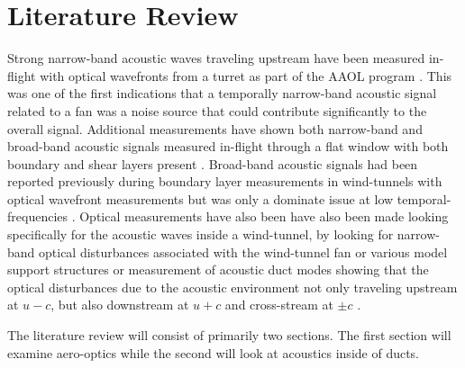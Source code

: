 
\chapter{Literature Review}
\label{chap:02_lit_review}

Strong narrow-band acoustic waves traveling upstream have been measured in-flight with optical wavefronts from a turret as part of the AAOL program \cite{DeLucca-2018-gBQdjTmT}.
This was one of the first indications that a temporally narrow-band acoustic signal related to a fan was a noise source that could contribute significantly to the overall signal.
Additional measurements have shown both narrow-band and broad-band acoustic signals measured in-flight through a flat window with both boundary and shear layers present \cite{Gordeyev-2020-6HnfJMnC}.
Broad-band acoustic signals had been reported previously during boundary layer measurements in wind-tunnels with optical wavefront measurements but was only a dominate issue at low temporal-frequencies \cite{Gordeyev-2014-jcJndkHM,Smith-2013-VXArwwux}.
Optical measurements have also been have also been made looking specifically for the acoustic waves inside a wind-tunnel, by looking for narrow-band optical disturbances associated with the wind-tunnel fan or various model support structures \cite{Catron-2018-DdVp6VZf} or measurement of acoustic duct modes showing that the optical disturbances due to the acoustic environment not only traveling upstream at $u-c$, but also downstream at $u+c$ and cross-stream at $\pm c$ \cite{Catron-2020-x8njYmmu}.

The literature review will consist of primarily two sections.
The first section will examine aero-optics while the second will look at acoustics inside of ducts.

